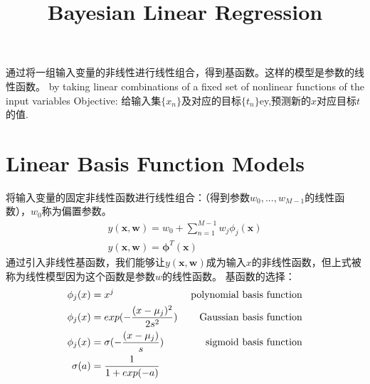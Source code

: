 \documentclass[a4paper]{article}
\begin{document}
\title{Bayesian Linear Regression}
\author{}
\maketitle

通过将一组输入变量的非线性进行线性组合，得到基函数。这样的模型是参数的线性函数。
by taking linear combinations of a fixed set of nonlinear functions of the input variables
Objective:
给输入集$\{x_n\}$及对应的目标$\{t_n\}$ey,预测新的$x$对应目标$t$的值.

\section{Linear Basis Function Models}
将输入变量的固定非线性函数进行线性组合：（得到参数$w_0,...,w_{M-1}$的线性函数），$w_0$称为偏置参数。
\begin{align*}
  y(\mathbf{x},\mathbf{w}) = w_0 + \sum_{n=1}^{M-1} w_j\phi_j(\mathbf{x})\\
  y(\mathbf{x},\mathbf{w}) = \boldsymbol{\phi}^T(\mathbf{x})
\end{align*}
通过引入非线性基函数，我们能够让$y(\mathbf{x},\mathbf{w})$成为输入$x$的非线性函数，但上式被称为线性模型因为这个函数是参数$w$的线性函数。
基函数的选择：
\begin{align*}
  \phi_j(x) &= x^j &\text{ polynomial basis function}\\
  \phi_j(x) &= exp(-{(x-\mu_j)^2 \over 2s^2 }) &\text{ Gaussian basis function}\\
  \phi_j(x) &= \sigma(-{(x-\mu_j) \over s }) &\text{  sigmoid basis function}\\
  \sigma(a) &= {1 \over 1+exp(-a)}
\end{align*}
\end{document}
